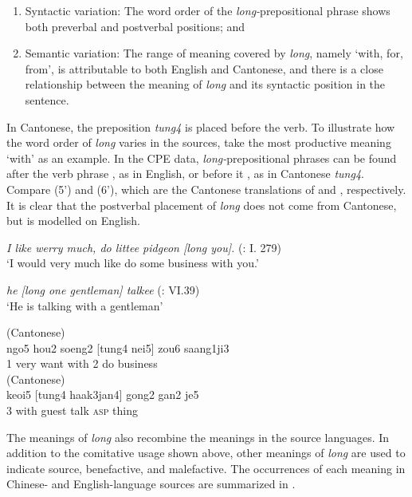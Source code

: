 \documentclass[output=paper]{langsci/langscibook}
\begin{document}
\begin{enumerate}
\renewcommand{\labelenumi}{\alph{enumi})}
\item Syntactic variation: The word order of the \textit{long-}prepositional phrase shows both preverbal and postverbal positions; and 
\item Semantic variation: The range of meaning covered by \textit{long}, namely ‘with, for, from’, is attributable to both English and Cantonese, and there is a close relationship between the meaning of \textit{long} and its syntactic position in the sentence.
\end{enumerate}

In Cantonese, the preposition \textit{tung4} is placed before the verb. To illustrate how the word order of \textit{long} varies in the sources, take the most productive meaning ‘with’ as an example. In the CPE data, \textit{long-}prepositional phrases can be found after the verb phrase , as in English, or before it , as in Cantonese \textit{tung4}. Compare (5’) and (6’), which are the Cantonese translations of  and , respectively. It is clear that the postverbal placement of \textit{long} does not come from Cantonese, but is modelled on English. 

\ea%
    \label{ex:7:5}
\textit{I like werry much, do littee pidgeon [long you].} (\citealt{downing_fan-qui_1838}: I. 279)\\
\glt ‘I would very much like do some business with you.’ 

\ex%
    \label{ex:7:6}
\textit{he [long one gentleman] talkee} (\citealt{tong_chinese_1862}: VI.39)\\
\glt ‘He is talking with a gentleman’ 

\ex (Cantonese)\\
\gll ngo5  hou2  soeng2   [tung4   nei5]  zou6  saang1ji3\\
1    very   want    with      2    do   business\\
\ex (Cantonese)\\
keoi5  [tung4    haak3jan4]  gong2   gan2   je5\\
3  with        guest    talk   \textsc{asp}  thing
\z

The meanings of \textit{long} also recombine the meanings in the source languages. In addition to the comitative usage shown above, other meanings of \textit{long} are used to indicate source, benefactive, and malefactive. The occurrences of each meaning in Chinese- and English-language sources are summarized in .
\end{document}
